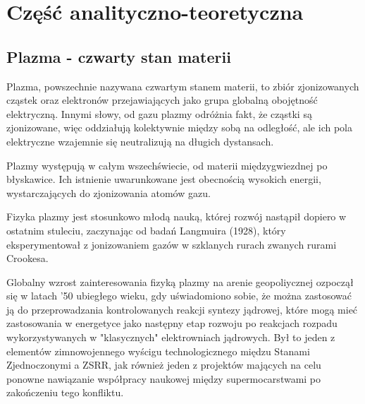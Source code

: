 
\section[Część analityczno-teoretyczna]{Część analityczno-teoretyczna} %

    \subsection{Plazma - czwarty stan materii}

    Plazma, powszechnie nazywana czwartym stanem materii, to zbiór zjonizowanych
    cząstek oraz elektronów przejawiających jako grupa globalną obojętność elektryczną. Innymi słowy, od gazu plazmy
    odróżnia fakt, że cząstki są zjonizowane, więc oddziałują kolektywnie między sobą na odległość,
    ale ich pola elektryczne wzajemnie się neutralizują na długich dystansach.

    Plazmy występują w całym wszechświecie, od materii międzygwiezdnej po błyskawice.
    Ich istnienie uwarunkowane jest obecnością wysokich energii, wystarczających do zjonizowania atomów gazu.

    Fizyka plazmy jest stosunkowo młodą nauką, której rozwój nastąpił dopiero w ostatnim stuleciu, zaczynając od badań
    Langmuira (1928), który eksperymentował z jonizowaniem gazów w szklanych rurach zwanych rurami Crookesa. 

    Globalny wzrost zainteresowania fizyką plazmy na arenie geopoliycznej ozpoczął się w latach '50 ubiegłego wieku, 
    gdy uświadomiono sobie, że można zastosować ją do przeprowadzania kontrolowanych reakcji syntezy jądrowej, 
    które mogą mieć zastosowania w energetyce jako następny etap rozwoju po reakcjach rozpadu wykorzystywanych
    w "klasycznych" elektrowniach jądrowych. Był to jeden z elementów zimnowojennego wyścigu technologicznego
    międzu Stanami Zjednoczonymi a ZSRR, 
    jak również jeden z projektów mających na celu ponowne nawiązanie współpracy naukowej między supermocarstwami
    po zakończeniu tego konfliktu. 

